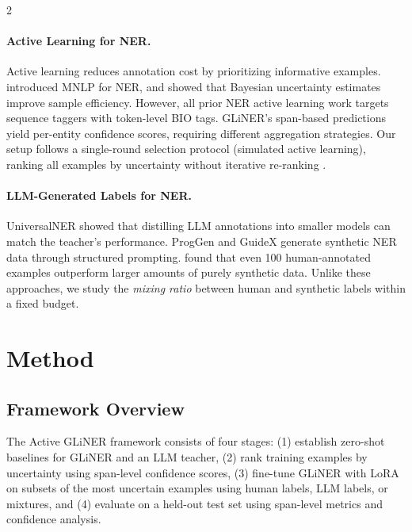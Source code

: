 \documentclass[11pt]{article}
\newcommand{\method}{Active GLiNER}
\begin{document}
\begin{multicols}{2}
\paragraph{Active Learning for NER.}
Active learning reduces annotation cost by prioritizing informative examples. \citet{shen2017deep} introduced MNLP for NER, and \citet{siddhant2018deep} showed that Bayesian uncertainty estimates improve sample efficiency. However, all prior NER active learning work targets sequence taggers with token-level BIO tags. GLiNER's span-based predictions yield per-entity confidence scores, requiring different aggregation strategies. Our setup follows a single-round selection protocol (simulated active learning), ranking all examples by uncertainty without iterative re-ranking \citep{lowell2019practical}.

\paragraph{LLM-Generated Labels for NER.}
UniversalNER \citep{zhou2024universalner} showed that distilling LLM annotations into smaller models can match the teacher's performance. ProgGen \citep{heng2024proggen} and GuideX \citep{fuente2025guidex} generate synthetic NER data through structured prompting. \citet{kamath2025synthetic} found that even 100 human-annotated examples outperform larger amounts of purely synthetic data. Unlike these approaches, we study the \emph{mixing ratio} between human and synthetic labels within a fixed budget.

\section{Method}

\subsection{Framework Overview}

The \method{} framework consists of four stages: (1) establish zero-shot baselines for GLiNER and an LLM teacher, (2) rank training examples by uncertainty using span-level confidence scores, (3) fine-tune GLiNER with LoRA on subsets of the most uncertain examples using human labels, LLM labels, or mixtures, and (4) evaluate on a held-out test set using span-level metrics and confidence analysis.


\end{multicols}
\end{document}

